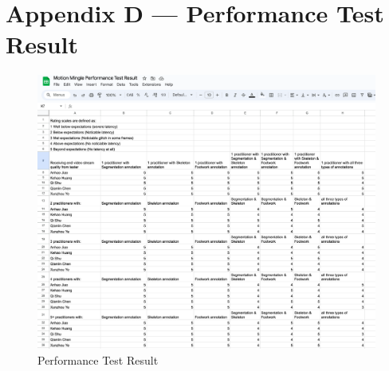 \documentclass[12pt, titlepage]{article}
\begin{document}
\section*{Appendix D --- Performance Test Result}
\FloatBarrier
\begin{figure}[!]
  \centering
  \includegraphics[width=1.0\linewidth]{performance.png}
  \caption{Performance Test Result}
  \label{fig:performance}
\end{figure}
\FloatBarrier
\end{document}
